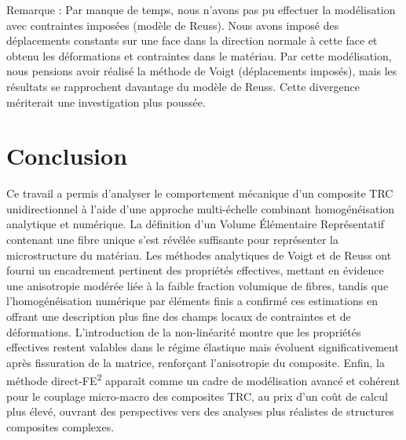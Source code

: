 \documentclass{rapportECL}
\begin{document}
Remarque : Par manque de temps, nous n'avons pas pu effectuer la modélisation avec contraintes imposées (modèle de Reuss). Nous avons imposé des déplacements constants sur une face dans la direction normale à cette face et obtenu les déformations et contraintes dans le matériau. Par cette modélisation, nous pensions avoir réalisé la méthode de Voigt (déplacements imposés), mais les résultats se rapprochent davantage du modèle de Reuss. Cette divergence mériterait une investigation plus poussée.

\newpage

\section{Conclusion}
Ce travail a permis d'analyser le comportement mécanique d'un composite TRC unidirectionnel à l'aide d'une approche multi-échelle combinant homogénéisation analytique et numérique. La définition d'un Volume Élémentaire Représentatif contenant une fibre unique s'est révélée suffisante pour représenter la microstructure du matériau. Les méthodes analytiques de Voigt et de Reuss ont fourni un encadrement pertinent des propriétés effectives, mettant en évidence une anisotropie modérée liée à la faible fraction volumique de fibres, tandis que l'homogénéisation numérique par éléments finis a confirmé ces estimations en offrant une description plus fine des champs locaux de contraintes et de déformations. L'introduction de la non-linéarité montre que les propriétés effectives restent valables dans le régime élastique mais évoluent significativement après fissuration de la matrice, renforçant l'anisotropie du composite. Enfin, la méthode direct-FE\textsuperscript{2} apparaît comme un cadre de modélisation avancé et cohérent pour le couplage micro-macro des composites TRC, au prix d'un coût de calcul plus élevé, ouvrant des perspectives vers des analyses plus réalistes de structures composites complexes.

\newpage
\end{document}

